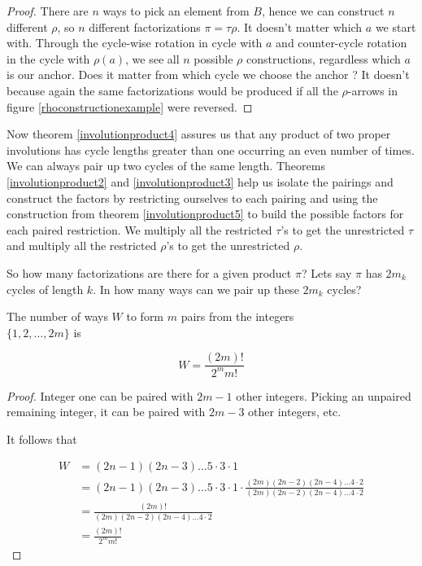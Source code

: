 \begin{proof}
There are $n$ ways to pick an element from $B$, hence we can construct $n$ different $\rho$, so $n$ different factorizations $\pi = \tau \rho$. It doesn't matter which $a$ we start with. Through the cycle-wise rotation in cycle with $a$ and counter-cycle rotation in the cycle with $\rho(a)$, we see all $n$ possible $\rho$ constructions, regardless which $a$ is our anchor. Does it matter from which cycle we choose the anchor ? It doesn't because again the same factorizations would be produced if all the $\rho$-arrows in figure \ref{rhoconstructionexample} were reversed.

\end{proof}

Now theorem \ref{involutionproduct4} assures us that any product of two proper involutions has cycle lengths greater than one occurring an even number of times. We can always pair up two cycles of the same length. Theorems \ref{involutionproduct2} and \ref{involutionproduct3} help us isolate the pairings and construct the factors by restricting ourselves to each pairing and using the construction from theorem \ref{involutionproduct5} to build the possible factors for each paired restriction. We multiply all the restricted $\tau$'s to get the unrestricted $\tau$ and multiply all the restricted $\rho$'s to get the unrestricted $\rho$.

So how many factorizations are there for a given product $\pi$? Lets say $\pi$ has $2m_k$ cycles of length $k$. In how many ways can we pair up these $2m_k$ cycles? 

\begin{thm}\label{numpairings}
The number of ways $W$ to form $m$ pairs from the integers \\
$\{1, 2, \ldots, 2m\}$ is

$$
W = \frac{(2m)!}{2^m m!}
$$

\end{thm}

\begin{proof}

Integer one can be paired with $2m-1$ other integers. Picking an unpaired remaining integer, it can be paired with $2m-3$ other integers, etc.

It follows that

\begin{align*}
W &= (2n-1)(2n-3) \ldots 5 \cdot 3 \cdot 1 \\
  &= (2n-1)(2n-3) \ldots 5 \cdot 3 \cdot 1 \cdot \frac{(2m)(2n-2)(2n-4) \ldots 4 \cdot 2}{(2m)(2n-2)(2n-4) \ldots 4 \cdot 2} \\
  &= \frac{(2m)!}{(2m)(2n-2)(2n-4) \ldots 4 \cdot 2} \\
  &=\frac{(2m)!}{2^m m!}
\end{align*}

\end{proof}


